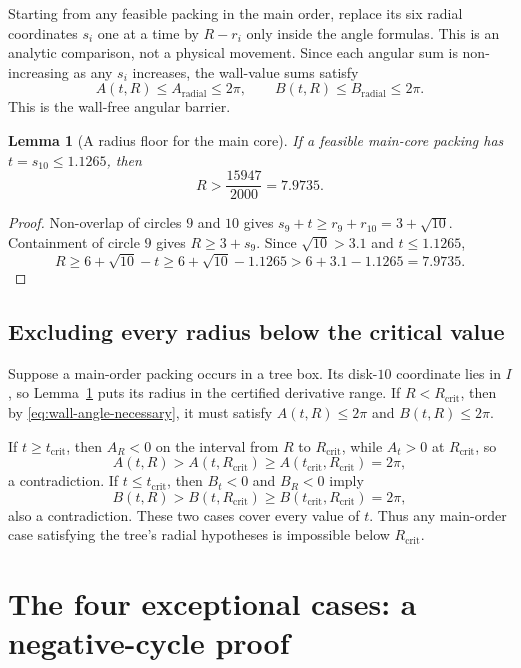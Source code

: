\documentclass[11pt,a4paper]{article}
\newtheorem{lemma}[theorem]{Lemma}
\theoremstyle{remark}
\newcommand{\Rcrit}{R_{\mathrm{crit}}}
\begin{document}
Starting from any feasible packing in the main order, replace its six radial
coordinates $s_i$ one at a time by $R-r_i$ only inside the angle formulas.
This is an analytic comparison, not a physical movement.  Since each angular
sum is non-increasing as any $s_i$ increases, the wall-value sums satisfy
\[
  A(t,R)\le A_{\mathrm{radial}}\le2\pi,\qquad
  B(t,R)\le B_{\mathrm{radial}}\le2\pi.
 \label{eq:wall-angle-necessary}
\]
This is the wall-free angular barrier.

\begin{lemma}[A radius floor for the main core]
\label{lem:main-radius-floor}
If a feasible main-core packing has $t=s_{10}\le1.1265$, then
\[
 R>\frac{15947}{2000}=7.9735.
\]
\end{lemma}

\begin{proof}
Non-overlap of circles $9$ and $10$ gives
$s_9+t\ge r_9+r_{10}=3+\sqrt{10}$.  Containment of circle $9$ gives
$R\ge3+s_9$.  Since $\sqrt{10}>3.1$ and $t\le1.1265$,
\[
 R\ge6+\sqrt{10}-t
   \ge6+\sqrt{10}-1.1265
   >6+3.1-1.1265
   =7.9735.
\]
\end{proof}

\subsection{Excluding every radius below the critical value}

Suppose a main-order packing occurs in a tree box.  Its disk-$10$ coordinate
lies in $I$, so Lemma~\ref{lem:main-radius-floor} puts its radius in the
certified derivative range.  If $R<\Rcrit$, then by
\eqref{eq:wall-angle-necessary}, it must satisfy $A(t,R)\le2\pi$ and
$B(t,R)\le2\pi$.

If $t\ge t_{\mathrm{crit}}$, then $A_R<0$ on the interval from $R$ to
$R_{\mathrm{crit}}$, while $A_t>0$ at $R_{\mathrm{crit}}$, so
\[
 A(t,R)>A(t,\Rcrit)
          \ge A(t_{\mathrm{crit}},\Rcrit)=2\pi,
\]
a contradiction.  If $t\le t_{\mathrm{crit}}$, then $B_t<0$ and
$B_R<0$ imply
\[
 B(t,R)>B(t,\Rcrit)
          \ge B(t_{\mathrm{crit}},\Rcrit)=2\pi,
\]
also a contradiction.  These two cases cover every value of $t$.  Thus any
main-order case satisfying the tree's radial hypotheses is impossible below
$\Rcrit$.

\section{The four exceptional cases: a negative-cycle proof}
\label{sec:four-cases}
\end{document}
